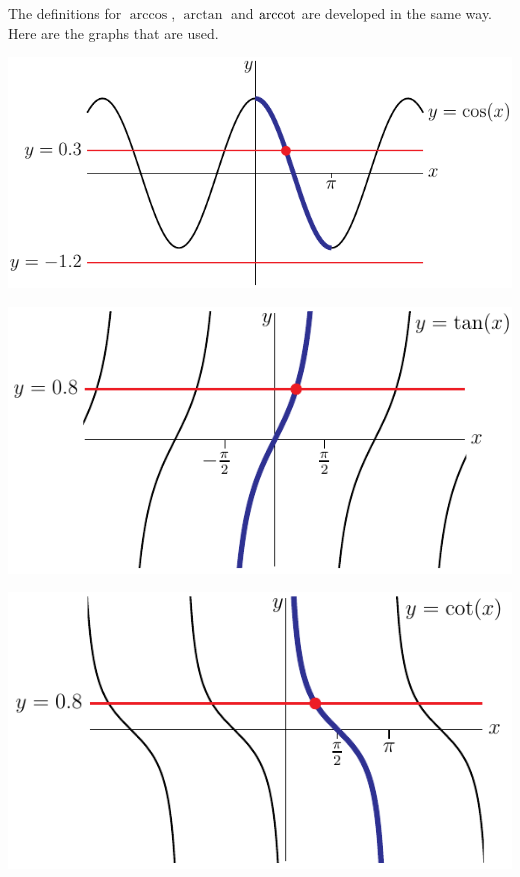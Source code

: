 The definitions for $\arccos$, $\arctan$ and $\mathop{\mathrm{arccot}}$ are developed in 
the same way. Here are the graphs that are used.
\begin{efig}
\begin{center}
  \includegraphics{cosInvB}
\end{center}
\begin{center}
  \includegraphics{tanInvB}
\end{center}
\begin{center}
  \includegraphics{cotInvB.pdf}
\end{center}
\end{efig}
